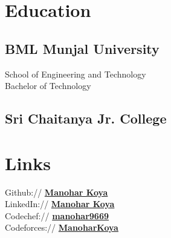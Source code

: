 \documentclass[]{deedy-resume-openfont}
\begin{document}
%
%
\lastupdated

%
%

%
%

\begin{minipage}[t]{0.33\textwidth} 


\section{Education} 

\subsection{BML Munjal University}
School of Engineering and Technology\\
Bachelor of Technology\\
\sectionsep

\subsection{Sri Chaitanya Jr. College}
\sectionsep


\section{Links} 
Github:// \href{https://github.com/ManoharKoya}{\bf Manohar Koya} \\
LinkedIn://  \href{https://www.linkedin.com/in/manohar-koya-157857175/}{\bf Manohar Koya} \\
Codechef://  \href{https://www.codechef.com/users/manohar9669}{\bf manohar9669} \\
Codeforces://  \href{https://codeforces.com/profile/ManoharKoya}{\bf ManoharKoya}
\sectionsep


\end{minipage}
\end{document}
